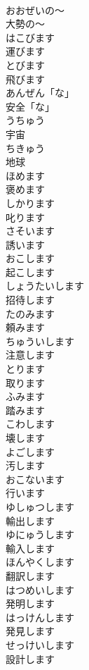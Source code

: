 \documentclass[8pt]{extreport}
\begin{document}
\begin{CJK}{UTF8}{min}
\\	おおぜいの〜	
\\	大勢の〜		
\\	はこびます	
\\	運びます		
\\	とびます	
\\	飛びます		
\\	あんぜん「な」	
\\	安全「な」		
\\	うちゅう	
\\	宇宙		
\\	ちきゅう	
\\	地球		
\\	ほめます	
\\	褒めます	
\\	しかります	
\\	叱ります	
\\	さそいます	
\\	誘います	
\\	おこします	
\\	起こします		
\\	しょうたいします	
\\	招待します		
\\	たのみます	
\\	頼みます	
\\	ちゅういします	
\\	注意します		
\\	とります	
\\	取ります		
\\	ふみます	
\\	踏みます	
\\	こわします	
\\	壊します	
\\	よごします	
\\	汚します	
\\	おこないます	
\\	行います		
\\	ゆしゅつします	
\\	輸出します	
\\	ゆにゅうします	
\\	輸入します		
\\	ほんやくします	
\\	翻訳します		
\\	はつめいします	
\\	発明します	
\\	はっけんします	
\\	発見します	
\\	せっけいします	
\\	設計します		

\end{CJK}
\end{document}
